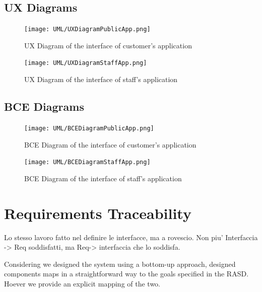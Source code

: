 \documentclass[11pt]{article} %
\begin{document}
\subsection{UX Diagrams}

\begin{figure}[H]
	\centering
	\texttt{[image: UML/UXDiagramPublicApp.png]}
	\caption{UX Diagram of the interface of customer's application}
\end{figure}

\begin{figure}[H]
	\centering
	\texttt{[image: UML/UXDiagramStaffApp.png]}
	\caption{UX Diagram of the interface of staff's application}
\end{figure}	

\subsection{BCE Diagrams}

\begin{figure}[H]
	\centering
	\texttt{[image: UML/BCEDiagramPublicApp.png]}
	\caption{BCE Diagram of the interface of customer's application}
\end{figure}	

\begin{figure}[H]
	\centering
	\texttt{[image: UML/BCEDiagramStaffApp.png]}
	\caption{BCE Diagram of the interface of staff's application}
\end{figure}	
	

\newpage
\section{Requirements Traceability}

{\color{red} {Lo stesso lavoro fatto nel definire le interfacce, ma a rovescio. Non piu' Interfaccia -> Req soddisfatti, ma Req-> interfaccia che lo soddisfa.}}

Considering we designed the system using a bottom-up approach, designed components maps in a straightforward way to the goals specified in the RASD. Hoever we provide an explicit mapping of the two.
\end{document}
